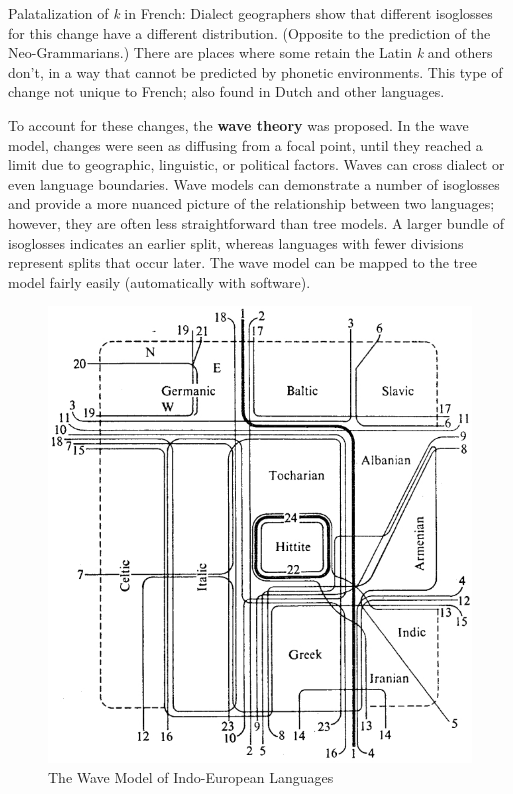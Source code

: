\documentclass{exam}
\begin{document}
Palatalization of \textit{k} in French: Dialect geographers show that different isoglosses for this change have a different distribution. (Opposite to the prediction of the Neo-Grammarians.) There are places where some retain the Latin \textit{k} and others don't, in a way that cannot be predicted by phonetic environments. This type of change not unique to French; also found in Dutch and other languages. 

To account for these changes, the \textbf{wave theory }was proposed. In the wave model, changes were seen as diffusing from a focal point, until they reached a limit due to geographic, linguistic, or political factors. Waves can cross dialect or even language boundaries. Wave models can demonstrate a number of isoglosses and provide a more nuanced picture of the relationship between two languages; however, they are often less straightforward than tree models. A larger bundle of isoglosses indicates an earlier split, whereas languages with fewer divisions represent splits that occur later. The wave model can be mapped to the tree model fairly easily (automatically with software). 

\begin{figure}[h!]
\centering
\includegraphics[scale=.6]{Indo.jpg}
\caption{The Wave Model of Indo-European Languages}
\label{fig:download}
\end{figure}
\end{document}
